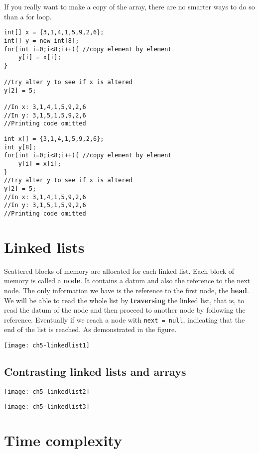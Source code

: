 \if{}
If you really want to make a copy of the array, there are no smarter ways to do so than a for loop.

\begin{lstlisting}
int[] x = {3,1,4,1,5,9,2,6};
int[] y = new int[8]; 
for(int i=0;i<8;i++){ //copy element by element
    y[i] = x[i];
}

//try alter y to see if x is altered
y[2] = 5; 

//In x: 3,1,4,1,5,9,2,6
//In y: 3,1,5,1,5,9,2,6
//Printing code omitted
\end{lstlisting}
\else
\begin{lstlisting}
int x[] = {3,1,4,1,5,9,2,6};
int y[8];
for(int i=0;i<8;i++){ //copy element by element
    y[i] = x[i];
}
//try alter y to see if x is altered
y[2] = 5;
//In x: 3,1,4,1,5,9,2,6
//In y: 3,1,5,1,5,9,2,6
//Printing code omitted
\end{lstlisting}
\fi

\section{Linked lists}

Scattered blocks of memory are allocated for each linked list. Each block of memory is called a \textbf{node}. It contains a datum and also the reference to the next node. The only information we have is the reference to the first node, the \textbf{head}. We will be able to read the whole list by \textbf{traversing} the linked list, that is, to read the datum of the node and then proceed to another node by following the reference. Eventually if we reach a node with \texttt{next = null}, indicating that the end of the list is reached. As demonstrated in the figure.

\texttt{[image: ch5-linkedlist1]}

\subsection{Contrasting linked lists and arrays}

\texttt{[image: ch5-linkedlist2]}

\texttt{[image: ch5-linkedlist3]}

\section{Time complexity}

